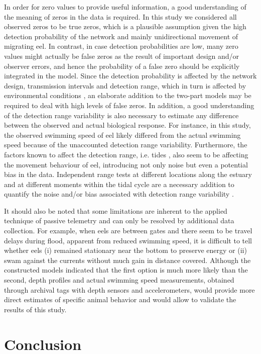 \documentclass[preprint,12pt,authoryear]{elsarticle}
\begin{document}
In order for zero values to provide useful information, a good understanding of the meaning of zeros in the data is required. In this study we considered all observed zeros to be true zeros, which is a plausible assumption given the high detection probability of the network and mainly unidirectional movement of migrating eel. In contrast, in case detection probabilities are low, many zero values might actually be false zeros as the result of important design and/or observer errors, and hence the probability of a false zero should be explicitly integrated in the model. Since the detection probability is affected by the network design, transmission intervals and detection range, which in turn is affected by environmental conditions \citep{Reubens2018}, an elaborate addition to the two-part models may be required to deal with high levels of false zeros. In addition, a good understanding of the detection range variability is also necessary to estimate any difference between the observed and actual biological response. For instance, in this study, the observed swimming speed of eel likely differed from the actual swimming speed because of the unaccounted detection range variability. Furthermore, the factors known to affect the detection range, i.e. tides \citep{Mathies2014EnvironmentalArrays}, also seem to be affecting the movement behaviour of eel, introducing not only noise but even a potential bias in the data. Independent range tests at different locations along the estuary and at different moments within the tidal cycle are a necessary addition to quantify the noise and/or bias associated with detection range variability \citep{Kessel2014}. 

It should also be noted that some limitations are inherent to the applied technique of passive telemetry and can only be resolved by additional data collection. For example, when eels are between gates and there seem to be travel delays during flood, apparent from reduced swimming speed, it is difficult to tell whether eels (i) remained stationary near the bottom to preserve energy or (ii) swam against the currents without much gain in distance covered. Although the constructed models indicated that the first option is much more likely than the second, depth profiles and actual swimming speed measurements, obtained through archival tags with depth sensors and accelerometers, would provide more direct estimates of specific animal behavior and would allow to validate the results of this study.  

\section{Conclusion}
\end{document}
